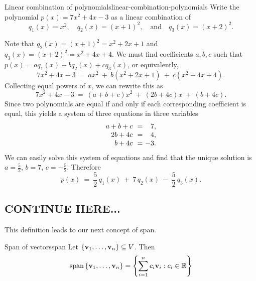 \begin{example}{Linear combination of polynomials}{linear-combination-polynomials}
  Write the polynomial $p(x) = 7x^2 + 4x - 3$ as a linear combination%
   of
  \begin{equation*}
    q_1(x) = x^2,\quad
    q_2(x) = (x+1)^2,\quad\mbox{and}\quad
    q_3(x) = (x+2)^2.
  \end{equation*}
\end{example}

\begin{solution}
  Note that $q_2(x) = (x+1)^2 = x^2 + 2x + 1$ and
  $q_3(x) = (x+2)^2 = x^2 + 4x + 4$. We must find coefficients $a,b,c$
  such that $p(x) = aq_1(x) + bq_2(x) + cq_3(x)$, or equivalently,
  \begin{equation*}
    7x^2 + 4x - 3 ~=~ ax^2 ~+~ b(x^2 + 2x + 1) ~+~ c(x^2 + 4x + 4).
  \end{equation*}
  Collecting equal powers of $x$, we can rewrite this as
  \begin{equation*}
    7x^2 + 4x - 3 ~=~ (a+b+c)x^2 ~+~ (2b+4c)x ~+~ (b+4c).
  \end{equation*}
  Since two polynomials are equal if and only if each corresponding
  coefficient is equal, this yields a system of three equations in
  three variables
  \begin{equation*}
    \begin{array}{r@{~~}c@{~}r}
      a+b+c &=& 7, \\
      2b+4c &=& 4, \\
      b+4c &=& -3.
    \end{array}
  \end{equation*}      
  We can easily solve this system of equations and find that the
  unique solution is $a=\frac{5}{2}$, $b=7$,
  $c=-\frac{5}{2}$. Therefore
  \begin{equation*}
    p(x) ~=~ \frac{5}{2}\,q_1(x) ~+~ 7\,q_2(x) ~-~ \frac{5}{2}\,q_3(x).
  \end{equation*}
\end{solution}

\subsection*{CONTINUE HERE...}

This definition leads to our next concept of span.

\begin{definition}{Span of vectors}{span}
  Let $\left\{\mbox{\bf v}_{1},\ldots,\mbox{\bf v}_{n}\right\} \subseteq V$.
  Then
  \begin{equation*} \sspan\set{\vect{v}_{1},\ldots,\vect{v}_{n}} =
    \set{\sum_{i=1}^{n}c_{i}\vect{v}_{i}: c_{i}\in \R }
  \end{equation*}
\end{definition}

